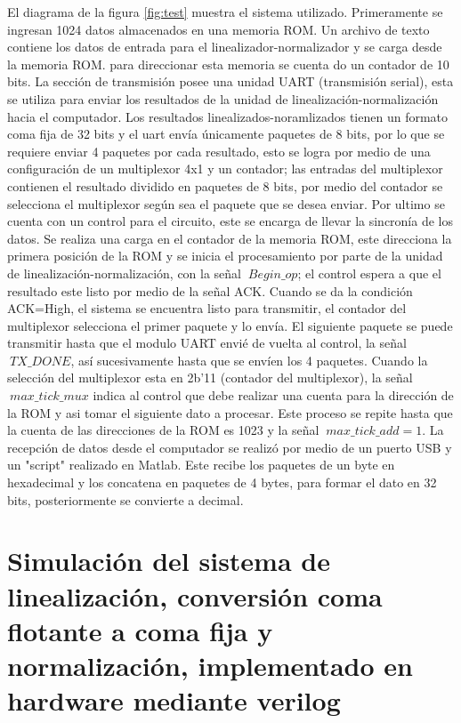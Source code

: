 El diagrama de la figura \ref{fig:test} muestra el sistema utilizado. 
Primeramente se ingresan 1024 datos almacenados en una memoria ROM. Un archivo de texto contiene los datos de entrada para el linealizador-normalizador y se carga desde la memoria ROM. para direccionar esta memoria se cuenta do un contador de 10 bits. 
La sección de transmisión posee una unidad UART (transmisión serial), esta se utiliza para enviar los resultados de la unidad de linealización-normalización hacia el computador. Los resultados linealizados-noramlizados tienen un formato coma fija de 32 bits y el uart envía únicamente paquetes de 8 bits, por lo que se requiere enviar 4 paquetes por cada resultado, esto se logra por medio de una configuración de un multiplexor 4x1 y un contador; las entradas del multiplexor contienen el resultado dividido en paquetes de 8 bits, por medio del contador se selecciona el multiplexor según sea el paquete que se desea enviar. 
Por ultimo se cuenta con un control para el circuito, este se encarga de llevar la sincronía de los datos. Se realiza una carga en el contador de la memoria ROM, este direcciona la primera posición de la ROM y se inicia el procesamiento por parte de la unidad de linealización-normalización, con la señal $\ Begin\_op$; el control espera a que el resultado este listo por medio de la señal ACK. Cuando se da la condición ACK=High, el sistema se encuentra listo para transmitir, el contador del multiplexor selecciona el primer paquete y lo envía. El siguiente paquete se puede transmitir hasta que el modulo UART envié de vuelta al control, la señal $\ TX\_DONE$, así sucesivamente hasta que se envíen los 4 paquetes. Cuando la selección del multiplexor esta en 2b'11 (contador del multiplexor), la señal $\ max\_tick\_mux$ indica al control que debe realizar una cuenta para la dirección de la ROM y asi tomar el siguiente dato a procesar. 
Este proceso se repite hasta que la cuenta de las direcciones de la ROM es 1023 y la señal $\ max\_tick\_add = 1 $.
La recepción de datos desde el computador se realizó por medio de un puerto USB y un "script" realizado en Matlab. Este recibe los paquetes de un byte en hexadecimal y los concatena en paquetes de 4 bytes, para formar el dato en 32 bits, posteriormente se convierte a decimal.   


\section{Simulación del sistema de linealización, conversión coma flotante a coma fija y normalización, implementado en hardware mediante verilog}

